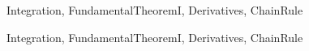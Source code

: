 \begin{tagblock}{Integration, FundamentalTheoremI, Derivatives, ChainRule}
\begin{question}
\begin{enumerate}
\end{enumerate}

	
	
\begin{tags}
	   Integration, FundamentalTheoremI, Derivatives, ChainRule
\end{tags}
	
\begin{diary}
\end{diary}
	
\begin{solution}
	   
	    \end{enumerate}
\end{solution}
	
\end{question}

\end{tagblock}


